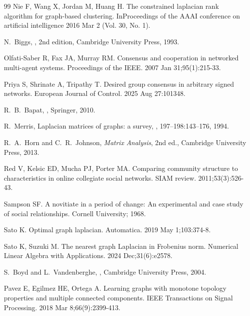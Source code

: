 \documentclass[11pt]{article}
\begin{document}
\begin{thebibliography}{99}
 Nie F, Wang X, Jordan M, Huang H. The constrained laplacian rank algorithm for graph-based clustering. InProceedings of the AAAI conference on artificial intelligence 2016 Mar 2 (Vol. 30, No. 1).
        
		N.~Biggs,
		, 2nd edition,
		\newblock Cambridge University Press, 1993.

Olfati-Saber R, Fax JA, Murray RM. Consensus and cooperation in networked multi-agent systems. Proceedings of the IEEE. 2007 Jan 31;95(1):215-33.
        
		Priya S, Shrinate A, Tripathy T. Desired group consensus in arbitrary signed networks. European Journal of Control. 2025 Aug 27:101348.
		
		R.~B.~Bapat,
		,
		\newblock Springer, 2010.

		R.~Merris,
		\newblock Laplacian matrices of graphs: a survey,
		, 
		197--198:143--176, 1994.

		R.~A.~Horn and C.~R.~Johnson,
		\newblock \emph{Matrix Analysis}, 2nd ed.,
		\newblock Cambridge University Press, 2013.
        
		
 Red V, Kelsic ED, Mucha PJ, Porter MA. Comparing community structure to characteristics in online collegiate social networks. SIAM review. 2011;53(3):526-43.



 Sampson SF. A novitiate in a period of change: An experimental and case study of social relationships. Cornell University; 1968.

Sato K. Optimal graph laplacian. Automatica. 2019 May 1;103:374-8.

 Sato K, Suzuki M. The nearest graph Laplacian in Frobenius norm. Numerical Linear Algebra with Applications. 2024 Dec;31(6):e2578.

		S.~Boyd and L.~Vandenberghe,
		,
		\newblock Cambridge University Press, 2004.

 Pavez E, Egilmez HE, Ortega A. Learning graphs with monotone topology properties and multiple connected components. IEEE Transactions on Signal Processing. 2018 Mar 8;66(9):2399-413.




	\end{thebibliography}
	
\end{document}
